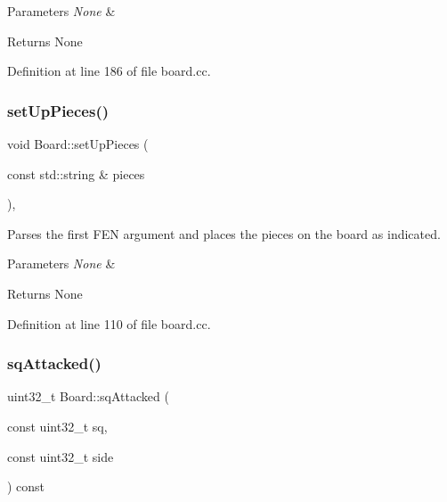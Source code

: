 \begin{DoxyParams}{Parameters}
{\em None} & \\
\hline
\end{DoxyParams}
\begin{DoxyReturn}{Returns}
None 
\end{DoxyReturn}


Definition at line 186 of file board.\+cc.

\mbox{\label{classBoard_a097a5d64cd3772c539f7ce6dda9a929a}} 
\subsubsection{\texorpdfstring{set\+Up\+Pieces()}{setUpPieces()}}
{\footnotesize\ttfamily void Board\+::set\+Up\+Pieces (\begin{DoxyParamCaption}\item[{const std\+::string \&}]{pieces }\end{DoxyParamCaption})\hspace{0.3cm}{\ttfamily [private]}, {\ttfamily [noexcept]}}



Parses the first F\+EN argument and places the pieces on the board as indicated. 


\begin{DoxyParams}{Parameters}
{\em None} & \\
\hline
\end{DoxyParams}
\begin{DoxyReturn}{Returns}
None 
\end{DoxyReturn}


Definition at line 110 of file board.\+cc.

\mbox{\label{classBoard_aeb6553a6d78975ad65261542ba8989e4}} 
\subsubsection{\texorpdfstring{sq\+Attacked()}{sqAttacked()}}
{\footnotesize\ttfamily uint32\+\_\+t Board\+::sq\+Attacked (\begin{DoxyParamCaption}\item[{const uint32\+\_\+t}]{sq,  }\item[{const uint32\+\_\+t}]{side }\end{DoxyParamCaption}) const\hspace{0.3cm}{\ttfamily [noexcept]}}



